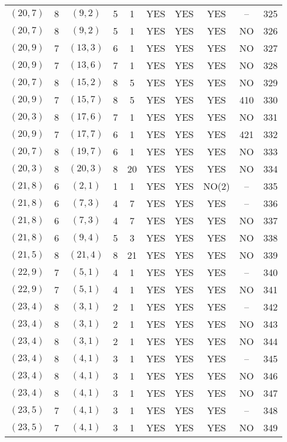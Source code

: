 \begin{longtable}{|c|c|c|c|c|c|c|c|c|c|}
$(20, 7)$ & 8 & $(9, 2)$ & 5 & 1 & YES & YES & YES & -- & 325\\
$(20, 7)$ & 8 & $(9, 2)$ & 5 & 1 & YES & YES & YES & NO & 326\\
$(20, 9)$ & 7 & $(13, 3)$ & 6 & 1 & YES & YES & YES & NO & 327\\
$(20, 9)$ & 7 & $(13, 6)$ & 7 & 1 & YES & YES & YES & NO & 328\\
$(20, 7)$ & 8 & $(15, 2)$ & 8 & 5 & YES & YES & YES & NO & 329\\
$(20, 9)$ & 7 & $(15, 7)$ & 8 & 5 & YES & YES & YES & 410 & 330\\
$(20, 3)$ & 8 & $(17, 6)$ & 7 & 1 & YES & YES & YES & NO & 331\\
$(20, 9)$ & 7 & $(17, 7)$ & 6 & 1 & YES & YES & YES & 421 & 332\\
$(20, 7)$ & 8 & $(19, 7)$ & 6 & 1 & YES & YES & YES & NO & 333\\
$(20, 3)$ & 8 & $(20, 3)$ & 8 & 20 & YES & YES & YES & NO & 334\\
$(21, 8)$ & 6 & $(2, 1)$ & 1 & 1 & YES & YES & NO(2) & -- & 335\\
$(21, 8)$ & 6 & $(7, 3)$ & 4 & 7 & YES & YES & YES & -- & 336\\
$(21, 8)$ & 6 & $(7, 3)$ & 4 & 7 & YES & YES & YES & NO & 337\\
$(21, 8)$ & 6 & $(9, 4)$ & 5 & 3 & YES & YES & YES & NO & 338\\
$(21, 5)$ & 8 & $(21, 4)$ & 8 & 21 & YES & YES & YES & NO & 339\\
$(22, 9)$ & 7 & $(5, 1)$ & 4 & 1 & YES & YES & YES & -- & 340\\
$(22, 9)$ & 7 & $(5, 1)$ & 4 & 1 & YES & YES & YES & NO & 341\\
$(23, 4)$ & 8 & $(3, 1)$ & 2 & 1 & YES & YES & YES & -- & 342\\
$(23, 4)$ & 8 & $(3, 1)$ & 2 & 1 & YES & YES & YES & NO & 343\\
$(23, 4)$ & 8 & $(3, 1)$ & 2 & 1 & YES & YES & YES & NO & 344\\
$(23, 4)$ & 8 & $(4, 1)$ & 3 & 1 & YES & YES & YES & -- & 345\\
$(23, 4)$ & 8 & $(4, 1)$ & 3 & 1 & YES & YES & YES & NO & 346\\
$(23, 4)$ & 8 & $(4, 1)$ & 3 & 1 & YES & YES & YES & NO & 347\\
$(23, 5)$ & 7 & $(4, 1)$ & 3 & 1 & YES & YES & YES & -- & 348\\
$(23, 5)$ & 7 & $(4, 1)$ & 3 & 1 & YES & YES & YES & NO & 349\\

\end{longtable}
